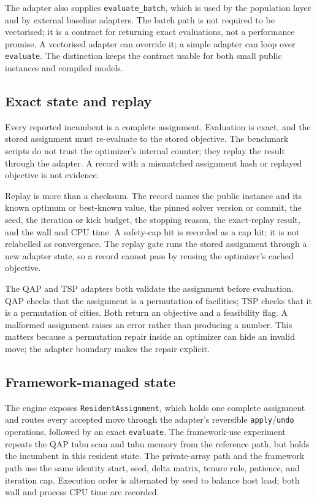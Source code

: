 \documentclass[11pt]{article}
\begin{document}
The adapter also supplies \texttt{evaluate\_batch}, which is used by the population layer and by
external baseline adapters. The batch path is not required to be vectorised; it is a contract for
returning exact evaluations, not a performance promise. A vectorised adapter can override it; a
simple adapter can loop over \texttt{evaluate}. The distinction keeps the contract usable for both
small public instances and compiled models.

\subsection{Exact state and replay}

Every reported incumbent is a complete assignment. Evaluation is exact, and the stored assignment must
re-evaluate to the stored objective. The benchmark scripts do not trust the optimizer's internal
counter; they replay the result through the adapter. A record with a mismatched assignment hash or
replayed objective is not evidence.

Replay is more than a checksum. The record names the public instance and its known optimum or
best-known value, the pinned solver version or commit, the seed, the iteration or kick budget, the
stopping reason, the exact-replay result, and the wall and CPU time. A safety-cap hit is recorded as a
cap hit; it is not relabelled as convergence. The replay gate runs the stored assignment through a
new adapter state, so a record cannot pass by reusing the optimizer's cached objective.

The QAP and TSP adapters both validate the assignment before evaluation. QAP checks that the
assignment is a permutation of facilities; TSP checks that it is a permutation of cities. Both return
an objective and a feasibility flag. A malformed assignment raises an error rather than producing a
number. This matters because a permutation repair inside an optimizer can hide an invalid move; the
adapter boundary makes the repair explicit.

\subsection{Framework-managed state}

The engine exposes \texttt{ResidentAssignment}, which holds one complete assignment and routes every
accepted move through the adapter's reversible \texttt{apply}/\texttt{undo} operations, followed by
an exact \texttt{evaluate}. The framework-use experiment repeats the QAP tabu scan and tabu memory
from the reference path, but holds the incumbent in this resident state. The private-array path and
the framework path use the same identity start, seed, delta matrix, tenure rule, patience, and
iteration cap. Execution order is alternated by seed to balance host load; both wall and process CPU
time are recorded.
\end{document}
